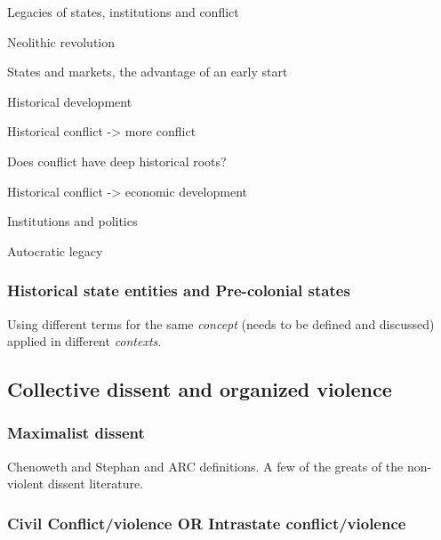 \documentclass[12pt]{article}
\begin{document}

Legacies of states, institutions and conflict

\citet{Putterman2008} Neolithic revolution

\citet{Bockstette2002} States and markets, the advantage of an early start

\citet{Nunn_2020} Historical development 

\citet{Michalopoulos2018}

\citet{Michalopoulos2016}

\citet{Michalopoulos2013}

\citet{Borcan2018}

\citet{Englebert2000}

\citet{Besley2014} Historical conflict -> more conflict

\citet{Fearon2014} Does conflict have deep historical roots?

\citet{Dincecco2019} Historical conflict -> economic development

\citet{Wilfahrt2018} Institutions and politics

\citet{Wilfahrt_2021}

\citet{Hariri2012} Autocratic legacy

\subsubsection{Historical state entities and Pre-colonial states} \label{Historical state entities and Pre-colonial states}

Using different terms for the same \textit{concept} (needs to be defined and
discussed) applied in different \textit{contexts}.

\subsection{Collective dissent and organized violence} \label{Collective dissent and organized violence}

\subsubsection{Maximalist dissent} \label{Maximalist dissent}

Chenoweth and Stephan and ARC definitions. A few of the greats of the
non-violent dissent literature.

\subsubsection{Civil Conflict/violence OR Intrastate conflict/violence} \label{Civil Conflict}
\end{document}
